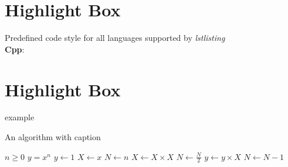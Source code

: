 \documentclass{assignment}
\begin{document}
\section*{Highlight Box}
Predefined code style for all languages supported by \textit{lstlisting} \\
\textbf{Cpp}:



\section*{Highlight Box}

 example
\begin{algorithm}
\caption{An algorithm with caption}\label{alg:cap}
\begin{algorithmic}
\Require $n \geq 0$
\Ensure $y = x^n$
\State $y \gets 1$
\State $X \gets x$
\State $N \gets n$
    \State $X \gets X \times X$
    \State $N \gets \frac{N}{2}$  
    \State $y \gets y \times X$
    \State $N \gets N - 1$
\EndIf
\EndWhile
\end{algorithmic}
\end{algorithm}
\end{document}
